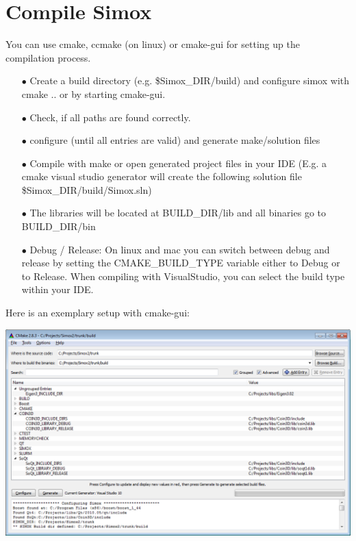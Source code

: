 \documentclass{book}
\begin{document}
\section{Compile Simox}
You can use cmake, ccmake (on linux) or cmake-gui for setting up the compilation process. 
\begin{itemize}

\item[$\bullet$]Create a build directory (e.g. \$Simox\_DIR/build) and configure simox with cmake .. or by starting cmake-gui.  
\item[$\bullet$]Check, if all paths are found correctly. 
\item[$\bullet$]configure (until all entries are valid) and generate make/solution files 
\item[$\bullet$]Compile with make or open generated project files in your IDE (E.g. a cmake visual studio generator will create the following solution file \$Simox\_DIR/build/Simox.sln)  
\item[$\bullet$]The libraries will be located at BUILD\_DIR/lib and all binaries go to BUILD\_DIR/bin 
\item[$\bullet$]Debug / Release: On linux and mac you can switch between debug and release by setting the CMAKE\_BUILD\_TYPE variable either to Debug or to Release. When compiling with VisualStudio, you can select the build type within your IDE.\par   
\end{itemize}
Here is an exemplary setup with cmake-gui:\par
\includegraphics[width=\textwidth]{Simox_cmake_gui}
\end{document}
